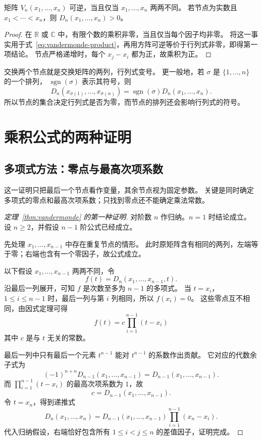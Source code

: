 \documentclass[UTF8,12pt,a4paper,fontset=fandol]{ctexart}
\begin{document}
\begin{corollary}[非零条件]
\label{cor:vandermonde-nonsingular}
矩阵 $V_n(x_1,\ldots,x_n)$ 可逆，当且仅当 $x_1,\ldots,x_n$ 两两不同。
若节点为实数且 $x_1<\cdots<x_n$，则 $D_n(x_1,\ldots,x_n)>0$。
\end{corollary}

\begin{proof}
在 $\mathbb R$ 或 $\mathbb C$ 中，有限个数的乘积非零，当且仅当每个因子均非零。
将这一事实用于式~\eqref{eq:vandermonde-product}，再用方阵可逆等价于行列式非零，即得第一项结论。
节点严格递增时，每个 $x_j-x_i$ 都为正，故乘积为正。
\end{proof}

交换两个节点就是交换矩阵的两列，行列式变号。
更一般地，若 $\sigma$ 是 $\{1,\ldots,n\}$ 的一个排列，
$\operatorname{sgn}(\sigma)$ 表示其符号，则
\[
  D_n(x_{\sigma(1)},\ldots,x_{\sigma(n)})
  =\operatorname{sgn}(\sigma)D_n(x_1,\ldots,x_n).
\]
所以节点的集合决定行列式是否为零，而节点的排列还会影响行列式的符号。

\section{乘积公式的两种证明}

\subsection{多项式方法：零点与最高次项系数}

这一证明只把最后一个节点看作变量，其余节点视为固定参数。
关键是同时确定多项式的零点和最高次项系数；只找到零点还不能确定乘法常数。

\begin{proof}[定理~\ref{thm:vandermonde} 的第一种证明]
对阶数 $n$ 作归纳。$n=1$ 时结论成立。
设 $n\geq2$，并假设 $n-1$ 阶公式已经成立。

先处理 $x_1,\ldots,x_{n-1}$ 中存在重复节点的情形。
此时原矩阵含有相同的两列，左端等于零；右端也含有一个零因子，故公式成立。

以下假设 $x_1,\ldots,x_{n-1}$ 两两不同，令
\[
  f(t)=D_n(x_1,\ldots,x_{n-1},t).
\]
沿最后一列展开，可知 $f$ 是次数至多为 $n-1$ 的多项式。
当 $t=x_i$，$1\leq i\leq n-1$ 时，最后一列与第 $i$ 列相同，所以 $f(x_i)=0$。
这些零点互不相同，由因式定理可得
\[
  f(t)=c\prod_{i=1}^{n-1}(t-x_i)
\]
其中 $c$ 是与 $t$ 无关的常数。

最后一列中只有最后一个元素 $t^{n-1}$ 能对 $t^{n-1}$ 的系数作出贡献。
它对应的代数余子式为
\[
  (-1)^{n+n}D_{n-1}(x_1,\ldots,x_{n-1})
  =D_{n-1}(x_1,\ldots,x_{n-1}).
\]
而 $\prod_{i=1}^{n-1}(t-x_i)$ 的最高次项系数为 $1$，故
\[
  c=D_{n-1}(x_1,\ldots,x_{n-1}).
\]
令 $t=x_n$，得到递推式
\begin{equation}
  D_n(x_1,\ldots,x_n)
  =D_{n-1}(x_1,\ldots,x_{n-1})\prod_{i=1}^{n-1}(x_n-x_i).
  \label{eq:vandermonde-recursion}
\end{equation}
代入归纳假设，右端恰好包含所有 $1\leq i<j\leq n$ 的差值因子，证明完成。
\end{proof}
\end{document}
